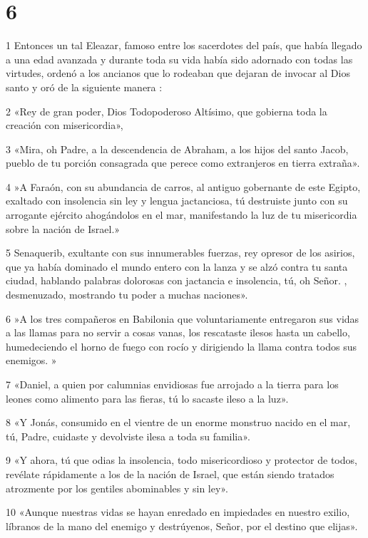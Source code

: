 \chapter{6}

\par 1 Entonces un tal Eleazar, famoso entre los sacerdotes del país, que había llegado a una edad avanzada y durante toda su vida había sido adornado con todas las virtudes, ordenó a los ancianos que lo rodeaban que dejaran de invocar al Dios santo y oró de la siguiente manera :
\par 2 «Rey de gran poder, Dios Todopoderoso Altísimo, que gobierna toda la creación con misericordia»,
\par 3 «Mira, oh Padre, a la descendencia de Abraham, a los hijos del santo Jacob, pueblo de tu porción consagrada que perece como extranjeros en tierra extraña».
\par 4 »A Faraón, con su abundancia de carros, al antiguo gobernante de este Egipto, exaltado con insolencia sin ley y lengua jactanciosa, tú destruiste junto con su arrogante ejército ahogándolos en el mar, manifestando la luz de tu misericordia sobre la nación de Israel.»
\par 5 Senaquerib, exultante con sus innumerables fuerzas, rey opresor de los asirios, que ya había dominado el mundo entero con la lanza y se alzó contra tu santa ciudad, hablando palabras dolorosas con jactancia e insolencia, tú, oh Señor. , desmenuzado, mostrando tu poder a muchas naciones».
\par 6 »A los tres compañeros en Babilonia que voluntariamente entregaron sus vidas a las llamas para no servir a cosas vanas, los rescataste ilesos hasta un cabello, humedeciendo el horno de fuego con rocío y dirigiendo la llama contra todos sus enemigos. »
\par 7 «Daniel, a quien por calumnias envidiosas fue arrojado a la tierra para los leones como alimento para las fieras, tú lo sacaste ileso a la luz».
\par 8 «Y Jonás, consumido en el vientre de un enorme monstruo nacido en el mar, tú, Padre, cuidaste y devolviste ilesa a toda su familia».
\par 9 «Y ahora, tú que odias la insolencia, todo misericordioso y protector de todos, revélate rápidamente a los de la nación de Israel, que están siendo tratados atrozmente por los gentiles abominables y sin ley».
\par 10 «Aunque nuestras vidas se hayan enredado en impiedades en nuestro exilio, líbranos de la mano del enemigo y destrúyenos, Señor, por el destino que elijas».
